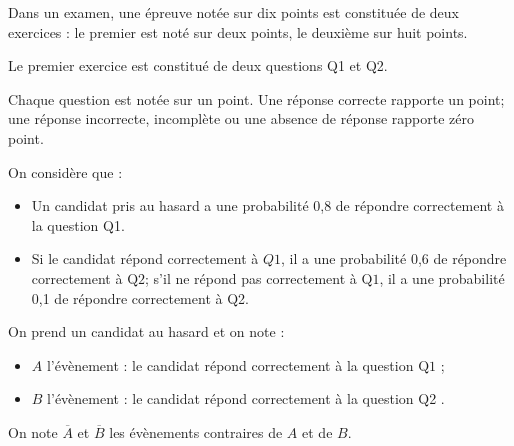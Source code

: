 Dans un examen, une épreuve notée sur dix points est constituée de deux exercices : le premier est noté sur deux points, le deuxième sur huit points.


\medskip


\medskip

Le premier exercice est constitué de deux questions Q1 et Q2.

Chaque question est notée sur un point. Une réponse correcte rapporte un point; une réponse incorrecte, incomplète ou une absence de réponse rapporte zéro point.

On considère que :

\begin{itemize}
\item Un candidat pris au hasard a une probabilité 0,8 de répondre correctement à la question Q1.
\item Si le candidat répond correctement à $Q 1$, il a une probabilité 0,6 de répondre correctement à $\mathrm{Q} 2$; s'il ne répond pas correctement à $\mathrm{Q} 1$, il a une probabilité 0,1 de répondre correctement à Q2.
\end{itemize}

On prend un candidat au hasard et on note :

	\begin{itemize}
		\item $A$ l'évènement : \og{}le candidat répond correctement à la question $\mathrm{Q} 1$ \fg{} ;
		\item $B$ l'évènement : \og{}le candidat répond correctement à la question Q2 \fg{}.
	\end{itemize}

On note $\overline{A}$ et $\overline{B}$ les évènements contraires de $A$ et de $B$.

